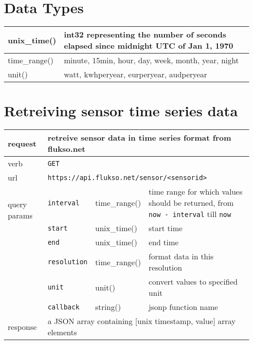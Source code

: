 \section{Data Types}
\begin{tabular}{|l|p{9.5cm}|}

\hline
unix\_time() & int32 representing the number of seconds elapsed since midnight UTC of Jan 1, 1970 \\

\hline
time\_range() & minute, 15min, hour, day, week, month, year, night \\

\hline
unit() & watt, kwhperyear, eurperyear, audperyear \\

\hline

\end{tabular}

\section{Retreiving sensor time series data}
\begin{tabular}{|l|l|l|p{5cm}|}

\hline
request & \multicolumn{3}{|l|}{retreive sensor data in time series format from flukso.net} \\

\hline
verb & \multicolumn{3}{|l|}{\texttt{GET}} \\

\hline
url & \multicolumn{3}{|l|}{\texttt{https://api.flukso.net/sensor/\textless sensorid\textgreater}} \\

\hline
\multirow{2}{*}{query params} & \texttt{interval} & time\_range() & time range for which values should be returned, from \texttt{now - interval} till \texttt{now} \\
& \texttt{start} & unix\_time() & start time \\
& \texttt{end} & unix\_time() & end time \\
& \texttt{resolution} & time\_range() & format data in this resolution \\
& \texttt{unit} & unit() & convert values to specified unit \\
& \texttt{{\small callback}} & string() & jsonp function name \\

\hline
response & \multicolumn{3}{|l|}{a JSON array containing [unix timestamp, value] array elements} \\

\hline

\end{tabular}

